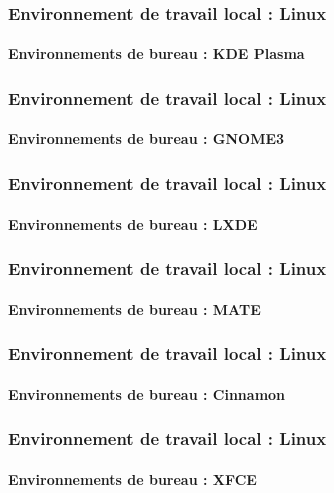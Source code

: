 \documentclass[xcolor=table]{beamer}
\begin{document}
\begin{frame}
\frametitle{Environnement de travail local : Linux}
\framesubtitle{Environnements de bureau : KDE Plasma}

\begin{center}
\end{center}

\end{frame}

\begin{frame}
\frametitle{Environnement de travail local : Linux}
\framesubtitle{Environnements de bureau : GNOME3}

\begin{center}
\end{center}

\end{frame}

\begin{frame}
\frametitle{Environnement de travail local : Linux}
\framesubtitle{Environnements de bureau : LXDE}

\begin{center}
\end{center}

\end{frame}

\begin{frame}
\frametitle{Environnement de travail local : Linux}
\framesubtitle{Environnements de bureau : MATE}

\begin{center}
\end{center}

\end{frame}


\begin{frame}
\frametitle{Environnement de travail local : Linux}
\framesubtitle{Environnements de bureau : Cinnamon}

\begin{center}
\end{center}

\end{frame}

\begin{frame}
\frametitle{Environnement de travail local : Linux}
\framesubtitle{Environnements de bureau : XFCE}

\begin{center}
\end{center}

\end{frame}
\end{document}
